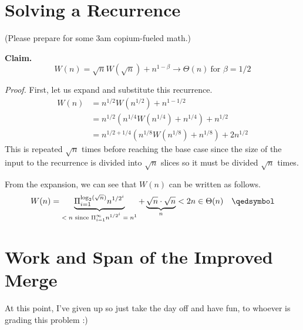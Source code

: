 \section{Solving a Recurrence}

(Please prepare for some 3am copium-fueled math.)

\textbf{Claim.} \[ W(n) = \sqrt nW(\sqrt n) + n^{1-\beta} \to \Theta(n)\ \text{for $\beta = 1/2$} \]

\textit{Proof.} First, let us expand and substitute this recurrence.
\[
\begin{aligned}
	W(n) &= n^{1/2}W(n^{1/2}) + n^{1 - 1/2} \\
		 &= n^{1/2}\left(n^{1/4}W(n^{1/4}) + n^{1/4}\right) + n^{1/2} \\
		 &= n^{1/2 + 1/4}\left(n^{1/8}W(n^{1/8}) + n^{1/8}\right) + 2n^{1/2}
\end{aligned}
\]
This is repeated $\sqrt n$ times before reaching the base case since the size of the input to the recurrence is divided into $\sqrt n$ slices so it must be divided $\sqrt n$ times.

From the expansion, we can see that $W(n)$ can be written as follows.
\[ W(n) = \underbrace{\Pi_{i=1}^{\log_2(\sqrt n)}n^{1/2^i}}_\text{$< n$ since $\Pi_{i=1}^\infty n^{1/2^i} = n^1$} + \underbrace{\sqrt n \cdot \sqrt n}_n < 2n \in \Theta(n) \quad \qedsymbol \]

\section{Work and Span of the Improved Merge}

At this point, I've given up so just take the day off and have fun, to whoever is grading this problem :)